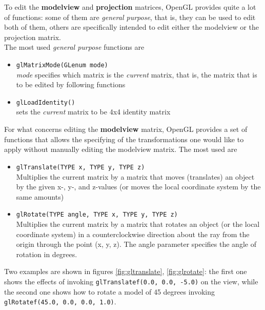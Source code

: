 To edit the \textbf{modelview} and \textbf{projection} matrices, OpenGL 
provides quite a lot of functions: some of them are 
\textit{general purpose}, that is, they can be used to edit both of them, 
others are specifically intended to edit either the modelview or the 
projection matrix.
\\
The most used \textit{general purpose} functions are 

\begin{itemize}
\item \texttt{glMatrixMode(GLenum mode)} \\
  \textit{mode} specifies which matrix is the \textit{current}
  matrix, that is, the matrix that is to be edited by following
  functions
  
\item \texttt{glLoadIdentity()} \\
  sets the \textit{current} matrix to be 4x4 identity matrix
\end{itemize}

For what concerns editing the \textbf{modelview} matrix, OpenGL 
provides a set of functions that allows the specifying of the 
transformations one would like to apply without manually 
editing the modelview matrix. The most used are 

\begin{itemize}
\item \texttt{glTranslate(TYPE x, TYPE y, TYPE z)}\\
  Multiplies the current matrix by a matrix that moves 
  (translates) an object by the given x-, y-, and z-values 
  (or moves the local coordinate system by the same amounts)

\item \texttt{glRotate(TYPE angle, TYPE x, TYPE y, TYPE z)} \\
  Multiplies the current matrix by a matrix that rotates an 
  object (or the   local coordinate system) in a counterclockwise 
  direction about the ray from the origin through the point 
  (x, y, z). The angle parameter specifies the angle of rotation in degrees.
\end{itemize}

Two examples are shown in figures \ref{fig:gltranslate}, \ref{fig:glrotate}:
the first one shows the effects of invoking \texttt{glTranslatef(0.0, 0.0, -5.0)} 
on the view, while the second one shows how to rotate a model of 45 degrees 
invoking \texttt{glRotatef(45.0, 0.0, 0.0, 1.0)}.

